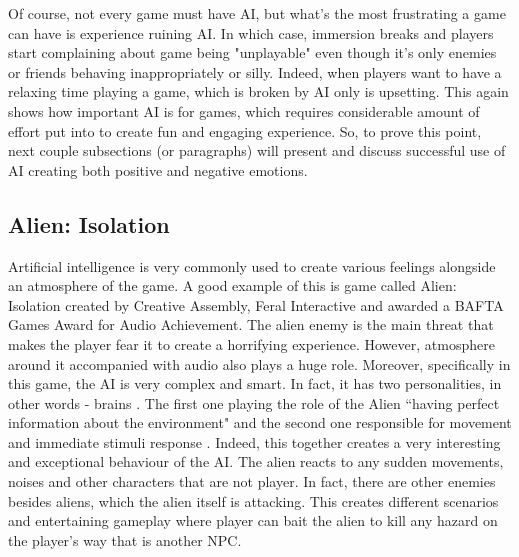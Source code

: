 \documentclass[journal]{IEEEtran}
\begin{document}
Of course, not every game must have AI, but what's the most frustrating a game can have is experience ruining AI. In which case, immersion breaks and players start complaining about game being "unplayable" even though it's only enemies or friends behaving inappropriately or silly. Indeed, when players want to have a relaxing time playing a game, which is broken by AI only is upsetting. This again shows how important AI is for games, which requires considerable amount of effort put into to create fun and engaging experience. So, to prove this point, next couple subsections (or paragraphs) will present and discuss successful use of AI creating both positive and negative emotions.

\subsection{Alien: Isolation}
Artificial intelligence is very commonly used to create various feelings alongside an atmosphere of the game. A good example of this is game called Alien: Isolation created by Creative Assembly, Feral Interactive and awarded a BAFTA Games Award for Audio Achievement. The alien enemy is the main threat that makes the player fear it to create a horrifying experience. However, atmosphere around it accompanied with audio also plays a huge role. Moreover, specifically in this game, the AI is very complex and smart. In fact, it has two personalities, in other words - brains \cite{seller2019horrific}. The first one playing the role of the Alien ``having perfect information about the environment" \cite{seller2019horrific} and the second one responsible for movement and immediate stimuli response \cite{seller2019horrific}. Indeed, this together creates a very interesting and exceptional behaviour of the AI. The alien reacts to any sudden movements, noises and other characters that are not player. In fact, there are other enemies besides aliens, which the alien itself is attacking. This creates different scenarios and entertaining gameplay where player can bait the alien to kill any hazard on the player's way that is another NPC.
\end{document}
